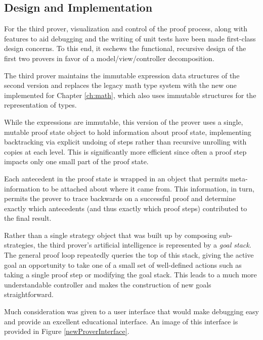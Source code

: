 	\subsection{Design and Implementation}

For the third prover, visualization and control of the proof process, along with features to aid debugging and the writing of unit tests have been made first-class design concerns.  To this end, it eschews the functional, recursive design of the first two provers in favor of a model/view/controller decomposition.

The third prover maintains the immutable expression data structures of the second version and replaces the legacy math type system with the new one implemented for Chapter \ref{ch:math}, which also uses immutable structures for the representation of types.

While the expressions are immutable, this version of the prover uses a single, mutable proof state object to hold information about proof state, implementing backtracking via explicit undoing of steps rather than recursive unrolling with copies at each level.  This is significantly more efficient since often a proof step impacts only one small part of the proof state.

Each antecedent in the proof state is wrapped in an object that permits meta-information to be attached about where it came from.  This information, in turn, permits the prover to trace backwards on a successful proof and determine exactly which antecedents (and thus exactly which proof steps) contributed to the final result.

Rather than a single strategy object that was built up by composing sub-strategies, the third prover's artificial intelligence is represented by a \emph{goal stack}.  The general proof loop repeatedly queries the top of this stack, giving the active goal an opportunity to take one of a small set of well-defined actions such as taking a single proof step or modifying the goal stack.  This leads to a much more understandable controller and makes the construction of new goals straightforward.

Much consideration was given to a user interface that would make debugging easy and provide an excellent educational interface.  An image of this interface is provided in Figure \ref{newProverInterface}.


